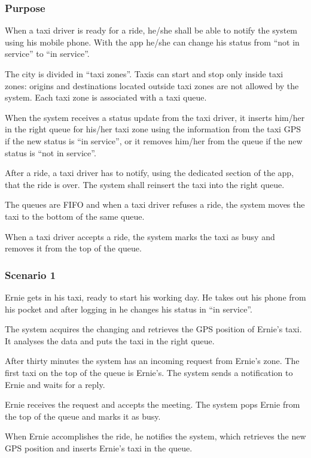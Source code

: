 \label{taxi-availability}
\subsubsection{Purpose}

When a taxi driver is ready for a ride, he/she shall be able to notify the system using his mobile phone. With the app he/she can change his status from ``not in service'' to ``in service''.

The city is divided in ``taxi zones''. Taxis can start and stop only inside taxi zones: origins and destinations located outside taxi zones are not allowed by the system.
Each taxi zone is associated with a taxi queue.

When the system receives a status update from the taxi driver, it inserts him/her in the right queue for his/her taxi zone using the information from the taxi GPS if the new status is ``in service'', or it removes him/her from the queue if the new status is ``not in service''.

After a ride, a taxi driver has to notify, using the dedicated section of the app, that the ride is over. The system shall reinsert the taxi into the right queue.

The queues are FIFO and when a taxi driver refuses a ride, the system moves the taxi to the bottom of the same queue.

When a taxi driver accepts a ride, the system marks the taxi as busy and removes it from the top of the queue.

\subsubsection{Scenario 1}
Ernie gets in his taxi, ready to start his working day. He takes out his phone from his pocket and after logging in he changes his status in ``in service''.

The system acquires the changing and retrieves the GPS position of Ernie's taxi. It analyses the data and puts the taxi in the right queue.

After thirty minutes the system has an incoming request from Ernie's zone. The first taxi on the top of the queue is Ernie's. The system sends a notification to Ernie and waits for a reply.

Ernie receives the request and accepts the meeting. The system pops Ernie from the top of the queue and marks it as busy.

When Ernie accomplishes the ride, he notifies the system, which retrieves the new GPS position and inserts Ernie's taxi in the queue.

